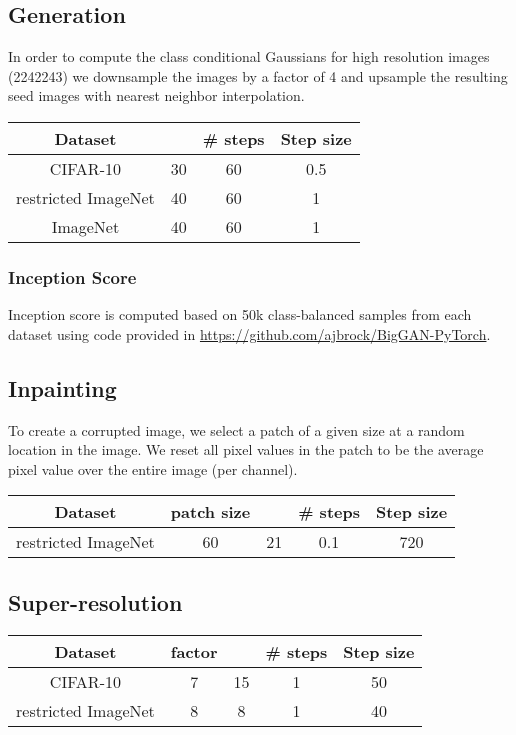 \documentclass{article}
\begin{document}
{\subsection{Generation}
In order to compute the class conditional Gaussians for high resolution images
(2242243) we downsample the images by a factor of 4 and upsample
the resulting seed images with nearest neighbor interpolation.

\begin{center}
\setlength{\tabcolsep}{.8cm}
\begin{tabular}{cccc}
\toprule 
Dataset &  & \# steps & Step size \\
\midrule
CIFAR-10 & 30 & 60 & 0.5 \\
restricted ImageNet & 40 & 60 & 1 \\
ImageNet & 40 & 60 & 1 \\
\bottomrule 
\end{tabular}
\end{center}

\subsubsection{Inception Score}
\label{app:is}
Inception score is computed based on 50k class-balanced samples from
each dataset using code provided in \url{https://github.com/ajbrock/BigGAN-PyTorch}.

\subsection{Inpainting}
To create a corrupted image, we select a patch of a given size at a random location in the image. We 
reset all pixel values in the patch to be the average pixel value over the entire image (per channel).
\begin{center}
	\setlength{\tabcolsep}{.8cm}
	\begin{tabular}{ccccc}
		\toprule 
		Dataset & patch size &  & \# steps & Step size \\
		\midrule
		restricted ImageNet & 60 & 21 & 0.1 & 720 \\
		\bottomrule 
	\end{tabular}
\end{center}

\subsection{Super-resolution}

\begin{center}
	\setlength{\tabcolsep}{.8cm}
	\begin{tabular}{ccccc}
		\toprule 
		Dataset &  factor &  & \# steps & Step size \\
		\midrule
		CIFAR-10 & 7 & 15 & 1 & 50 \\
		restricted ImageNet & 8 & 8 & 1 & 40 \\
		\bottomrule 
	\end{tabular}
\end{center}
 \clearpage
}
\end{document}
